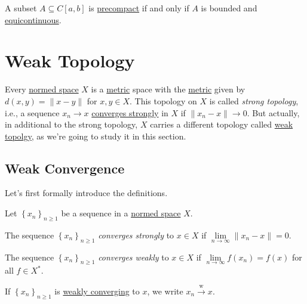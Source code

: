 \begin{theorem}\label{thm:Arzela-Ascoli}
	A subset \(A \subseteq C[a, b]\) is \hyperref[def:precompact]{precompact} if and only if \(A\) is bounded and \hyperref[def:equicontinuous]{equicontinuous}.
\end{theorem}

\section{Weak Topology}
Every \hyperref[def:normed-vector-space]{normed space} \(X\) is a \hyperref[prev:metric]{metric} space with the \hyperref[prev:metric]{metric} given by \(d(x, y) = \lVert x - y \rVert \) for \(x, y\in X\). This topology on \(X\) is called \emph{strong topology}, i.e., a sequence \(x_n \to x\) \hyperref[def:strongly-convergence]{converges strongly} in \(X\) if \(\lVert x_{n} - x \rVert \to 0\). But actually, in additional to the strong topology, \(X\) carries a different topology called \hyperref[def:weak-topology]{weak topolgy}, as we're going to study it in this section.

\subsection{Weak Convergence}
Let's first formally introduce the definitions.
\begin{definition*}
	Let \(\left\{ x_n \right\} _{n\geq 1}\) be a sequence in a \hyperref[def:normed-vector-space]{normed space} \(X\).
	\begin{definition}\label{def:strongly-convergence}
		The sequence \(\left\{ x_n \right\} _{n\geq 1}\) \emph{converges strongly} to \(x\in X\) if \(\lim\limits_{n \to \infty} \lVert x_n - x \rVert = 0\).
	\end{definition}
	\begin{definition}\label{def:weakly-convergence}
		The sequence \(\left\{ x_n \right\} _{n\geq 1}\) \emph{converges weakly} to \(x\in X\) if \(\lim\limits_{n \to \infty} f(x_n) = f(x)\) for all \(f\in X^{\ast} \).
	\end{definition}
\end{definition*}

\begin{notation}
	If \(\left\{ x_n \right\} _{n \geq 1}\) is \hyperref[def:weakly-convergence]{weakly converging} to \(x\), we write \(x_n \overset{\text{w}}{\to } x\).
\end{notation}

